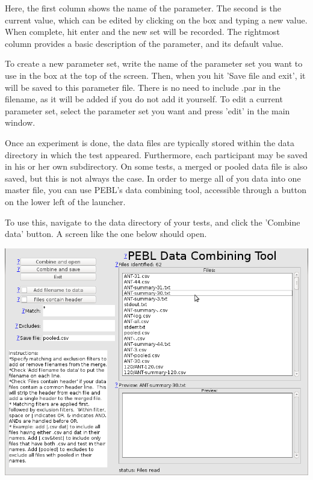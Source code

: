Here, the first column shows the name of the parameter. The second is the current value, which can be edited by clicking on the box and typing a new value.  When complete, hit enter and the new set will be recorded.  The rightmost column provides a basic description of the parameter, and its default value.  

To create a new parameter set, write the name of the parameter set you want to use in the box at the top of the screen. Then, when you hit 'Save file and exit', it will be saved to this parameter file. There is no need to include .par in the filename, as it will be added if you do not add it yourself.   To edit a current parameter set, select the parameter set you want and press 'edit' in the main window.
 
 
Once an experiment is done, the data files are typically stored within the data directory in which the test appeared.  Furthermore, each participant may be saved in his or her own subdirectory. On some tests, a merged or pooled data file is also saved, but this is not always the case.  In order to merge all of you data into one master file, you can use PEBL's data combining tool, accessible through a button on the lower left of the 
launcher.

To use this, navigate to the data directory of your tests, and click the 'Combine data' button.  A screen like the one below should open.


 \includegraphics[scale=.4]{images/combine.png} 
  
